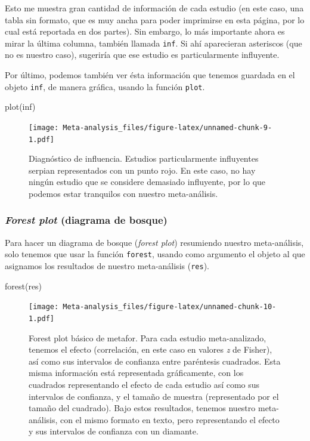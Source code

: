 \documentclass[
]{article}
\newenvironment{Shaded}{\begin{snugshade}}{\end{snugshade}}
\newcommand{\FunctionTok}[1]{\textcolor[rgb]{0.94,0.94,0.56}{#1}}
\newcommand{\NormalTok}[1]{\textcolor[rgb]{0.80,0.80,0.80}{#1}}
\begin{document}
Esto me muestra gran cantidad de información de cada estudio (en este
caso, una tabla sin formato, que es muy ancha para poder imprimirse en
esta página, por lo cual está reportada en dos partes). Sin embargo, lo
más importante ahora es mirar la última columna, también llamada
\texttt{inf}. Si ahí aparecieran asteriscos (que no es nuestro caso),
sugeriría que ese estudio es particularmente influyente.

Por último, podemos también ver ésta información que tenemos guardada en
el objeto \texttt{inf}, de manera gráfica, usando la función
\texttt{plot}.

\begin{Shaded}
\begin{Highlighting}[]
\FunctionTok{plot}\NormalTok{(inf)}
\end{Highlighting}
\end{Shaded}

\begin{figure}
\centering
\texttt{[image: Meta-analysis\_files/figure-latex/unnamed-chunk-9-1.pdf]}
\caption{Diagnóstico de influencia. Estudios particularmente influyentes
serpian representados con un punto rojo. En este caso, no hay ningún
estudio que se considere demasiado influyente, por lo que podemos estar
tranquilos con nuestro meta-análisis.}
\end{figure}

\hypertarget{forest-plot-diagrama-de-bosque}{%
\subsubsection{\texorpdfstring{\emph{Forest plot} (diagrama de
bosque)}{Forest plot (diagrama de bosque)}}\label{forest-plot-diagrama-de-bosque}}

Para hacer un diagrama de bosque (\emph{forest plot}) resumiendo nuestro
meta-análisis, solo tenemos que usar la función \texttt{forest}, usando
como argumento el objeto al que asignamos los resultados de nuestro
meta-análisis (\texttt{res}).

\begin{Shaded}
\begin{Highlighting}[]
\FunctionTok{forest}\NormalTok{(res)}
\end{Highlighting}
\end{Shaded}

\begin{figure}
\centering
\texttt{[image: Meta-analysis\_files/figure-latex/unnamed-chunk-10-1.pdf]}
\caption{Forest plot básico de metafor. Para cada estudio
meta-analizado, tenemos el efecto (correlación, en este caso en valores
\emph{z} de Fisher), así como sus intervalos de confianza entre
paréntesis cuadrados. Esta misma información está representada
gráficamente, con los cuadrados representando el efecto de cada estudio
así como sus intervalos de confianza, y el tamaño de muestra
(representado por el tamaño del cuadrado). Bajo estos resultados,
tenemos nuestro meta-análisis, con el mismo formato en texto, pero
representando el efecto y sus intervalos de confianza con un diamante.}
\end{figure}
\end{document}

